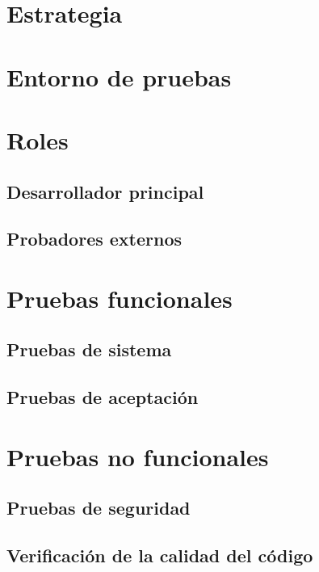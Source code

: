 

\section{Estrategia}

\section{Entorno de pruebas}


\section{Roles}

\subsection{Desarrollador principal}


\subsection{Probadores externos}

\section{Pruebas funcionales}

\subsection{Pruebas de sistema}


\subsection{Pruebas de aceptación}

\section{Pruebas no funcionales}


\subsection{Pruebas de seguridad}

\subsection{Verificación de la calidad del código}
